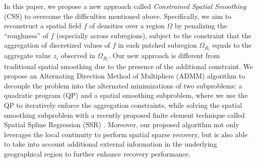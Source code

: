 In this paper, we propose a new approach called \emph{Constrained Spatial Smoothing} (CSS) to overcome the difficulties mentioned above. Specifically, we aim to reconstruct a spatial field $f$ of densities over a region $\Omega$ by penalizing the ``roughness'' of $f$ (especially across subregions), subject to the constraint that the aggregation of discretized values of $f$ in each patched subregion $\Omega_{B_i}$ equals to the aggregate value $z_i$ observed in $\Omega_{B_i}$. Our new approach is different from traditional spatial smoothing due to the presence of the additional constraint.
We propose an Alternating Direction Method of Multipliers (ADMM) \cite{boyd2011distributed} algorithm to decouple the problem into the alternated minimizations of two subproblems: a quadratic program (QP) and a spatial smoothing subproblem, where we use the QP to iteratively enforce the aggregation constraints, while solving the spatial smoothing subproblem with a recently proposed finite element technique called Spatial Spline Regression (SSR) \cite{Sanga13}. 
Moreover, our proposed algorithm not only leverages the local continuity to perform spatial sparse recovery, but is also able to take into account additional external information %
in the underlying geographical region 
to further enhance recovery performance.




